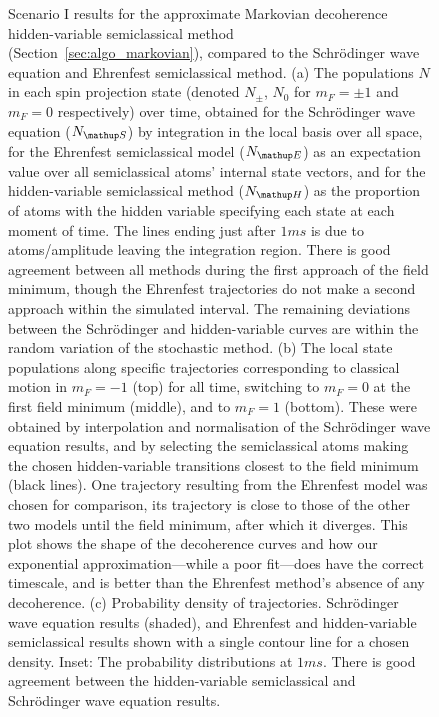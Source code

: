 {\begin{figure}
    \caption{Scenario I results for the approximate Markovian decoherence hidden-variable semiclassical method (Section~\ref{sec:algo_markovian}), compared to the Schr\"odinger wave equation and Ehrenfest semiclassical method. (a) The populations $N$ in each spin projection state (denoted $N_\pm$, $N_0$ for $m_F=\pm 1$ and $m_F=0$ respectively) over time, obtained for the Schr\"odinger wave equation ($N_\up{S}$) by integration in the local basis over all space, for the Ehrenfest semiclassical model ($N_\up{E}$) as an expectation value over all semiclassical atoms' internal state vectors, and for the hidden-variable semiclassical method ($N_\up{H}$) as the proportion of atoms with the hidden variable specifying each state at each moment of time. The lines ending just after $1\unit{ms}$ is due to atoms/amplitude leaving the integration region. There is good agreement between all methods during the first approach of the field minimum, though the Ehrenfest trajectories do not make a second approach within the simulated interval. The remaining deviations between the Schr\"odinger and hidden-variable curves are within the random variation of the stochastic method. (b) The local state populations along specific trajectories corresponding to classical motion in $m_F=-1$ (top) for all time, switching to $m_F=0$ at the first field minimum (middle), and to $m_F=1$ (bottom). These were obtained by interpolation and normalisation of the Schr\"odinger wave equation results, and by selecting the semiclassical atoms making the chosen hidden-variable transitions closest to the field minimum (black lines). One trajectory resulting from the Ehrenfest model was chosen for comparison, its trajectory is close to those of the other two models until the field minimum, after which it diverges. This plot shows the shape of the decoherence curves and how our exponential approximation---while a poor fit---does have the correct timescale, and is better than the Ehrenfest method's absence of any decoherence. (c) Probability density of trajectories. Schr\"odinger wave equation results (shaded), and Ehrenfest and hidden-variable semiclassical results shown with a single contour line for a chosen density. Inset: The probability distributions at $1\unit{ms}$. There is good agreement between the hidden-variable semiclassical and Schr\"odinger wave equation results.}\label{fig:scenario_one_markovian}
\end{figure}
\restoregeometry}

